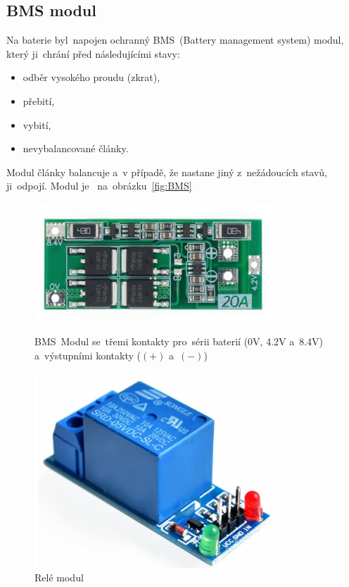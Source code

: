 \subsection{BMS modul}
Na baterie byl~napojen ochranný BMS~(Battery management system) modul, který ji~chrání před následujícími stavy:
\begin{itemize}
  \item odběr vysokého proudu (zkrat),
  \item přebití,
  \item vybití,
  \item nevybalancované články.
\end{itemize}
Modul články balancuje a~v případě, že nastane jiný z~nežádoucích stavů, ji~odpojí. Modul je ~na~obrázku~\ref{fig:BMS}


\begin{figure}[htb]
  \centering
  \begin{minipage}{0.45\textwidth}
    \centering
  \includegraphics[width=0.8\textwidth]{img/BMS.jpg}
  \caption{\label{fig:BMS} BMS~Modul se~třemi kontakty pro~sérii baterií (0V, 4.2V a~8.4V) a~výstupními kontakty ($(+)$ a~$(-)$)~\cite{laskakit-BMS}}
  \end{minipage}\hfill
  \begin{minipage}{0.45\textwidth}
    \centering
  \includegraphics[width=0.8\textwidth]{img/relay.jpg}
  \caption{\label{fig:relay} Relé modul~\cite{laskakit-relay}}
  \end{minipage}
\end{figure}

